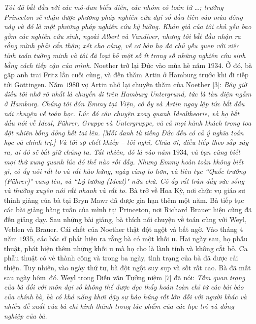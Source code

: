 \begin{multicols}{2}
	\vskip 0.05cm
	\textit{Tôi đã bắt đầu với các mô-đun biểu diễn, các nhóm có toán tử \ldots; trường Princeton sẽ nhận được phương pháp nghiên cứu đại số đầu tiên vào mùa đông này và đó là một phương pháp nghiên cứu kỹ lưỡng. Khán giả của tôi chủ yếu bao gồm các nghiên cứu sinh, ngoài Albert và Vandiver, nhưng tôi bắt đầu nhận ra rằng mình phải cẩn thận; xét cho cùng, về cơ bản họ đã chủ yếu quen với việc tính toán tường minh và tôi đã loại bỏ một số ít trong số những nghiên cứu sinh bằng cách tiếp cận của mình.}
	\vskip 0.05cm
	Noether trở lại Đức vào mùa hè năm $1934$. Ở đó, bà gặp anh trai Fritz lần cuối cùng, và đến thăm Artin ở Hamburg trước khi đi tiếp tới Göttingen. Năm $1980$ vợ Artin nhớ lại chuyến thăm của Noether [$3$]:
	\vskip 0.05cm
	\textit{Bây giờ điều tôi nhớ rõ nhất là chuyến đi trên Hamburg Untergrund, tức là tàu điện ngầm ở Hamburg. Chúng tôi đón Emmy tại Viện, cô ấy và Artin ngay lập tức bắt đầu nói chuyện về toán học. Lúc đó câu chuyện xoay quanh Idealtheorie, và họ bắt đầu nói về Ideal, Führer, Gruppe và Untergruppe, và cả mọi hành khách trong toa  đột nhiên bỗng dỏng hết tai lên. [Mỗi danh từ tiếng Đức đều có cả ý nghĩa toán học và chính trị.] Và tôi sợ chết khiếp -- tôi nghĩ, Chúa ơi, điều tiếp theo sắp xảy ra, ai đó sẽ bắt giữ chúng ta. Tất nhiên, đó là vào năm $1934$, và bạn cũng biết mọi thứ xung quanh lúc đó thế nào rồi đấy. Nhưng Emmy hoàn toàn không biết gì, cô ấy nói rất to và rất hào hứng, ngày càng to hơn, và liên tục ``Quốc trưởng (Führer)" vang lên, và ``Lý tưởng (Ideal)" nữa chứ. Cô ấy rất tràn đầy sức sống và thường xuyên nói rất nhanh và rất to.}
	\vskip 0.05cm
	Bà trở về Hoa Kỳ, nơi chức vụ giáo sư thỉnh giảng của bà tại Bryn Mawr đã được gia hạn thêm một năm. Bà  tiếp tục các bài giảng hàng tuần của mình tại Princeton, nơi Richard Brauer hiện cũng đã đến giảng dạy. Sau những bài giảng, bà thích nói chuyện về toán cùng với Weyl, Veblen và Brauer.
	\vskip 0.05cm
	Cái chết của Noether thật đột ngột và bất ngờ. Vào tháng $4$ năm $1935$, các bác sĩ phát hiện ra rằng bà có một khối u. Hai ngày sau, họ phẫu thuật, phát hiện thêm những khối u mà họ cho là lành tính và không cắt bỏ. Ca phẫu thuật có vẻ thành công và trong ba ngày, tình trạng của bà đã được cải thiện. Tuy nhiên, vào ngày thứ tư, bà đột ngột suy sụp và sốt rất cao. Bà đã mất sau ngày hôm~đó.
	\vskip 0.05cm
	Weyl trong Diễn văn Tưởng niệm [$7$] đã nói:
	\vskip 0.05cm
	\textit{Tầm quan trọng của bà đối với môn đại số không thể được đọc thấy hoàn toàn chỉ từ các bài báo của chính bà, bà có khả năng khơi dậy sự hào hứng rất lớn đối với người khác và nhiều đề xuất của bà chỉ hình thành trong tác phẩm của các học trò và đồng nghiệp của bà.}

\end{multicols}
